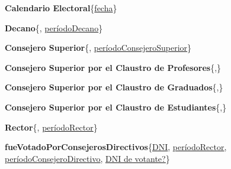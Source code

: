 \documentclass[a4paper, 10pt, twoside]{article}
\begin{document}
\textbf{Calendario Electoral}\{\underline{fecha}\}

\textbf{Decano}\{, \underline{períodoDecano}\}

\textbf{Consejero Superior}\{, \underline{períodoConsejeroSuperior}\}

\textbf{Consejero Superior por el Claustro de Profesores}\{,\}

\textbf{Consejero Superior por el Claustro de Graduados}\{,\}

\textbf{Consejero Superior por el Claustro de Estudiantes}\{,\}

\textbf{Rector}\{, \underline{períodoRector}\}

\textbf{fueVotadoPorConsejerosDirectivos}\{\underline{\underline{DNI}}, \underline{\underline{períodoRector}}, \underline{\underline{períodoConsejeroDirectivo}}, \underline{\underline{DNI de votante?}}\}
\end{document}
